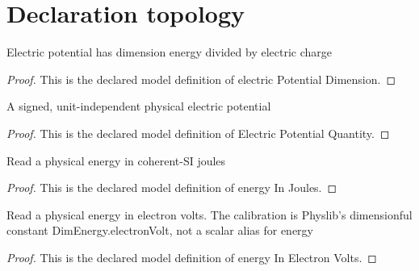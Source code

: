 \section{Declaration topology}
\begin{definition}
  \label{def:physics:phyx-mini-0585:phyxminiproblems-problemphyxmini0585-electricpotentialdimension}
  Electric potential has dimension energy divided by electric charge
\end{definition}
\begin{proof}
  This is the declared model definition of electric Potential Dimension.
\end{proof}
\begin{definition}
  \label{def:physics:phyx-mini-0585:phyxminiproblems-problemphyxmini0585-electricpotentialquantity}
  A signed, unit-independent physical electric potential
\end{definition}
\begin{proof}
  This is the declared model definition of Electric Potential Quantity.
\end{proof}
\begin{definition}
  \label{def:physics:phyx-mini-0585:phyxminiproblems-problemphyxmini0585-energyinjoules}
  Read a physical energy in coherent-SI joules
\end{definition}
\begin{proof}
  This is the declared model definition of energy In Joules.
\end{proof}
\begin{definition}
  \label{def:physics:phyx-mini-0585:phyxminiproblems-problemphyxmini0585-energyinelectronvolts}
  Read a physical energy in electron volts. The calibration is Physlib's dimensionful constant DimEnergy.electronVolt, not a scalar alias for energy
\end{definition}
\begin{proof}
  This is the declared model definition of energy In Electron Volts.
\end{proof}
